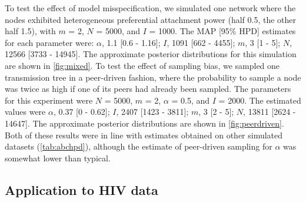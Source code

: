 To test the effect of model misspecification, we simulated one network where
the nodes exhibited heterogeneous preferential attachment power (half 0.5, the
other half 1.5), with $m$ = 2, $N$ = 5000, and $I$ = 1000. The MAP [95\%
HPD] estimates for each parameter were: 
$\alpha$, 
  1.1 
  [0.6 -
   1.16];
$I$,
  1091 
  [662 -
   4455];
$m$,
  3 
  [1 -
   5];
$N$,
  12566 
  [3733 -
   14945].
The approximate posterior distributions for this simulation are shown in
\cref{fig:mixed}. To test the effect of sampling bias, we sampled one
transmission tree in a peer-driven fashion, where the probability to sample a
node was twice as high if one of its peers had already been sampled. The
parameters for this experiment were $N$ = 5000, $m$ = 2, $\alpha$ = 0.5, and
$I$ = 2000. The estimated values were
$\alpha$, 
  0.37 
  [0 -
   0.62];
$I$,
  2407 
  [1423 -
   3811];
$m$,
  3 
  [2 -
   5];
$N$,
  13811 
  [2624 -
   14647].
The approximate posterior distributions are shown in \cref{fig:peerdriven}. Both
of these results were in line with estimates obtained on other simulated
datasets (\cref{tab:abchpd}), although the estimate of peer-driven sampling for
$\alpha$ was somewhat lower than typical.

%
%
%    

\subsection{Application to HIV data}



